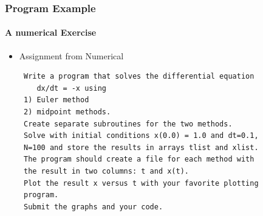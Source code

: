 \documentclass[unknownkeysallowed, 10pt, a4 paper, handout]{beamer}
\begin{document}
\begin{frame}[label=exercise_num, fragile=singleslide]
  \frametitle{Program Example}
  \framesubtitle{A numerical Exercise}
  \begin{itemize}
    \item Assignment from Numerical
      \footnotesize
{
\begin{verbatim}
 Write a program that solves the differential equation
    dx/dt = -x using
 1) Euler method
 2) midpoint methods.
 Create separate subroutines for the two methods.
 Solve with initial conditions x(0.0) = 1.0 and dt=0.1,
 N=100 and store the results in arrays tlist and xlist.
 The program should create a file for each method with
 the result in two columns: t and x(t).
 Plot the result x versus t with your favorite plotting
 program.
 Submit the graphs and your code.
\end{verbatim}
}
  \end{itemize}
\end{frame}
\end{document}
